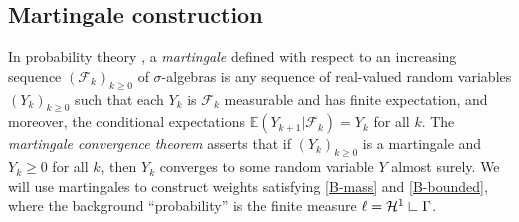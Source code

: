 \documentclass[12pt]{amsart}
\numberwithin{equation}{section}
\theoremstyle{plain}
\theoremstyle{definition}
\newcommand{\res}{\hbox{ {\vrule height .22cm}{\leaders\hrule\hskip.2cm} }}
\newcommand{\Haus}{\mathcal{H}}
\numberwithin{figure}{section}
\begin{document}
\subsection{Martingale construction}\label{ss:martingale}
In probability theory \cite[Chapter 4]{Durrett}, a \emph{martingale} defined with respect to an increasing sequence $(\mathcal{F}_k)_{k\geq 0}$ of $\sigma$-algebras is any sequence of real-valued random variables $(Y_k)_{k\geq 0}$ such that each $Y_k$ is $\mathcal{F}_k$ measurable and has finite expectation, and moreover, the conditional expectations $\mathbb{E}(Y_{k+1}|\mathcal{F}_k)=Y_k$ for all $k$. The \emph{martingale convergence theorem} asserts that if $(Y_k)_{k\geq 0}$ is a martingale and $Y_k\geq 0$ for all $k$, then $Y_k$ converges to some random variable $Y$ almost surely. We will use martingales to construct weights satisfying \eqref{B-mass} and \eqref{B-bounded}, where the background ``probability'' is the finite measure $\ell=\Haus^1\res\Gamma$.
\end{document}
